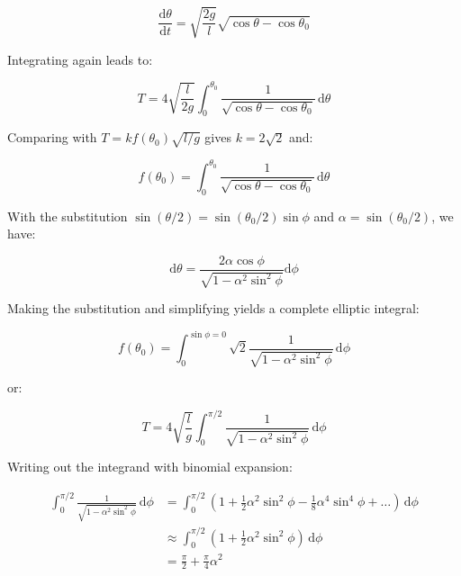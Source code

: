 \documentclass[12pt]{article}
\begin{document}
\begin{equation}
    \frac{\mathrm{d}\theta}{\mathrm{d}t} = \sqrt{\frac{2g}{l}} \sqrt{\cos{\theta} - \cos{\theta_{0}}}
\end{equation}

Integrating again leads to:

\begin{equation}
    T = 4 \sqrt{\frac{l}{2g}} \int_{0}^{\theta_{0}} \frac{1}{\sqrt{\cos{\theta} - \cos{\theta_{0}}}} \, \mathrm{d}\theta
\end{equation}

Comparing with $T = kf(\theta_{0}) \sqrt{l/g}$ gives $k = 2\sqrt{2}$ and:

\begin{equation}
    f(\theta_{0}) = \int_{0}^{\theta_{0}} \frac{1}{\sqrt{\cos{\theta} - \cos{\theta_{0}}}} \, \mathrm{d}\theta
\end{equation}

With the substitution $\sin{(\theta/2)} = \sin{(\theta_{0}/2)} \sin{\phi}$ and $\alpha = \sin{(\theta_{0}/2)}$, we have:

\begin{equation}
    \mathrm{d}\theta = \frac{2\alpha \cos{\phi}}{\sqrt{1 - \alpha^{2} \sin^{2}{\phi}}} \mathrm{d}\phi
\end{equation}

Making the substitution and simplifying yields a complete elliptic integral:

\begin{equation}
    f(\theta_{0}) = \int_{0}^{\sin{\phi} = 0} \sqrt{2} \frac{1}{\sqrt{1 - \alpha^{2} \sin^{2}{\phi}}} \, \mathrm{d}\phi
\end{equation}

or:

\begin{equation}
    T = 4 \sqrt{\frac{l}{g}} \int_{0}^{\pi/2} \frac{1}{\sqrt{1 - \alpha^{2} \sin^{2}{\phi}}} \, \mathrm{d}\phi
\end{equation}

Writing out the integrand with binomial expansion:

\begin{equation}
\begin{split}
    \int_{0}^{\pi/2} \frac{1}{\sqrt{1 - \alpha^{2} \sin^{2}{\phi}}} \, \mathrm{d}\phi &= \int_{0}^{\pi/2} \left( 1 + \frac{1}{2} \alpha^{2} \sin^{2}{\phi} - \frac{1}{8} \alpha^{4} \sin^{4}{\phi} + \dots \right) \, \mathrm{d}\phi \\
    &\approx \int_{0}^{\pi/2} \left( 1 + \frac{1}{2} \alpha^{2} \sin^{2}{\phi} \right) \, \mathrm{d}\phi \\
    &= \frac{\pi}{2} + \frac{\pi}{4} \alpha^{2}
\end{split}
\end{equation}
\end{document}
